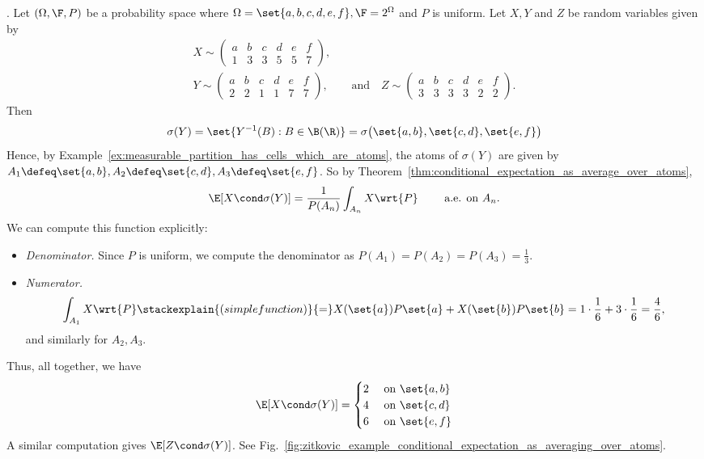 \documentclass{article} %
\begin{document}
\begin{example}
\cite{zitkovic2013lecture10}. Let $(\Omega, \F, P)$ be a probability space where $\Omega =\set{a,b,c,d,e,f}, \F=2^\Omega$ and $P$ is uniform.  Let $X,Y$ and $Z$ be random variables given by 
\begin{align*}
X \sim 
\begin{pmatrix}
a & b & c & d & e & f \\
1 & 3 & 3 & 5 & 5 & 7	
\end{pmatrix}, &
\\
Y \sim 
\begin{pmatrix}
a & b & c & d & e & f \\
2 & 2 & 1 & 1 & 7 & 7	
\end{pmatrix}, & \quad \text{and} \quad 
Z \sim 
\begin{pmatrix}
a & b & c & d & e & f \\
3 & 3 & 3 & 3 & 2 & 2
\end{pmatrix}. 	
\end{align*}
Then 
\[ \sigma(Y) = \set{Y^{-1}(B) : B \in \B(\R)} = \sigma \big(\set{a,b}, \set{c,d}, \set{e,f} \big) \]
Hence, by Example~\ref{ex:measurable_partition_has_cells_which_are_atoms}, the atoms of $\sigma(Y)$ are given by $A_1 \defeq \set{a,b}, A_2 \defeq \set{c,d}, A_3 \defeq \set{e,f}$.
So by Theorem~\ref{thm:conditional_expectation_as_average_over_atoms}, 
\[ \E[X \cond \sigma(Y)] = \frac{1}{P(A_n)} \int_{A_n} X \wrt{P}   \quad \quad \text{ a.e. on } A_n. \]
%
We can compute this function explicitly:
\begin{itemize}
\item \textit{Denominator.}  Since $P$ is uniform, we compute the denominator as $P(A_1)=P(A_2)=P(A_3) = \frac{1}{3}$.
\item \textit{Numerator.}
\[ \int_{A_1} X \wrt{P} \stackexplain{(simple function)}{=} X(\set{a}) P\set{a} + X(\set{b}) P\set{b} = 1 \cdot \frac{1}{6} +  3 \cdot \frac{1}{6} = \frac{4}{6},   \] 
and similarly for $A_2, A_3$.	
\end{itemize}
%
Thus, all together, we have
\[ \E[X \cond \sigma(Y)] = 
\begin{cases}
 2 & \text{ on } \set{a,b} \\
 4 & \text{ on } \set{c,d} \\
 6 & \text{ on } \set{e,f} \\
\end{cases}
\]
A similar computation gives $\E[Z \cond \sigma(Y)]$. See Fig.~\ref{fig:zitkovic_example_conditional_expectation_as_averaging_over_atoms}. 


\end{example}
\end{document}
